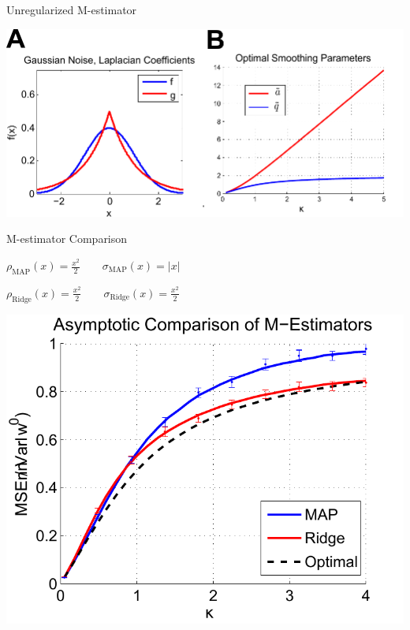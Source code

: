 \documentclass[pdf]{beamer}
\begin{document}
\begin{frame}{Unregularized M-estimator}
    
    
        \begin{center}
            \includegraphics[width = .7\linewidth]{regularizedPlots.pdf}
        \end{center}
    

\end{frame}


\begin{frame}{M-estimator Comparison}


\begin{center}
    $\rho_{\text{MAP}}(x) = \frac{x^2}{2} \quad\quad \sigma_{\text{MAP}}(x) = |x|$
    
    $ \rho_{\text{Ridge}}(x) = \frac{x^2}{2} \quad\quad \sigma_{\text{Ridge}}(x) = \frac{x^2}{2}$
\end{center}


\vspace{.1in}
        \begin{center}
            \includegraphics[width = .55\linewidth]{CompareM_est_redo.pdf}
        \end{center}
\end{frame}
\end{document}
